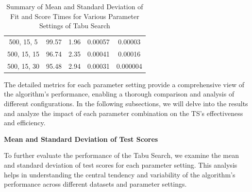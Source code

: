 \documentclass{article}
\begin{document}
\begin{table}[H]
{\begin{tabular}{|c|c|c|c|c|}
                500, 15, 5                 & 99.57                  & 1.96                  & 0.00057                  & 0.00003                 \\
                500, 15, 15                & 96.74                  & 2.35                  & 0.00041                  & 0.00016                 \\
                500, 15, 30                & 95.48                  & 2.94                  & 0.00031                  & 0.000004                \\
                \hline
            \end{tabular}
        }
        \caption{Summary of Mean and Standard Deviation of Fit and Score Times for Various Parameter Settings of Tabu Search}
        \label{tab:ts_summary_fit_score_times}
    \end{table}

    The detailed metrics for each parameter setting provide a comprehensive view of the algorithm's performance, enabling a thorough comparison and analysis of different configurations. In the following subsections, we will delve into the results and analyze the impact of each parameter combination on the TS's effectiveness and efficiency.

    \textbf{Mean and Standard Deviation of Test Scores}

    To further evaluate the performance of the Tabu Search, we examine the mean and standard deviation of test scores for each parameter setting. This analysis helps in understanding the central tendency and variability of the algorithm's performance across different datasets and parameter settings.
\end{document}
